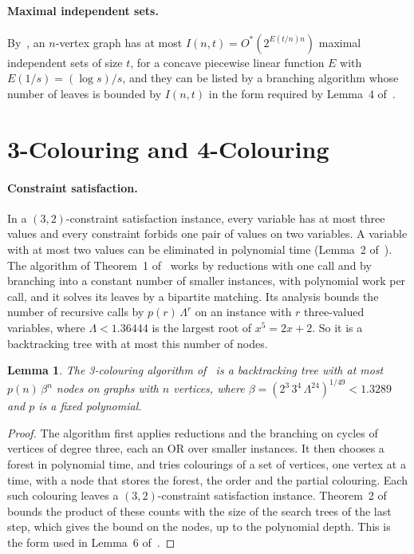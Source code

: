 \documentclass[11pt]{article}
\newtheorem{lemma}[theorem]{Lemma}
\theoremstyle{remark}
\begin{document}
\paragraph{Maximal independent sets.} By~\cite{Bys04}, an $n$-vertex graph has at most $I(n,t) = O^*(2^{E(t/n)n})$ maximal independent sets of size $t$, for a concave piecewise linear function $E$ with $E(1/s) = (\log s)/s$, and they can be listed by a branching algorithm whose number of leaves is bounded by $I(n,t)$ in the form required by Lemma~4 of~\cite{SM22}.

\section{3-Colouring and 4-Colouring}

\paragraph{Constraint satisfaction.} In a $(3,2)$-constraint satisfaction instance, every variable has at most three values and every constraint forbids one pair of values on two variables. A variable with at most two values can be eliminated in polynomial time (Lemma~2 of~\cite{BE05}). The algorithm of Theorem~1 of~\cite{BE05} works by reductions with one call and by branching into a constant number of smaller instances, with polynomial work per call, and it solves its leaves by a bipartite matching. Its analysis bounds the number of recursive calls by $p(r)\,\Lambda^r$ on an instance with $r$ three-valued variables, where $\Lambda < 1.36444$ is the largest root of $x^5 = 2x + 2$. So it is a backtracking tree with at most this number of nodes.

\begin{lemma}\label{lem:three}
The 3-colouring algorithm of~\cite{BE05} is a backtracking tree with at most $p(n)\,\beta^n$ nodes on graphs with $n$ vertices, where $\beta = (2^3\, 3^4\, \Lambda^{24})^{1/49} < 1.3289$ and $p$ is a fixed polynomial.
\end{lemma}

\begin{proof}
The algorithm first applies reductions and the branching on cycles of vertices of degree three, each an OR over smaller instances. It then chooses a forest in polynomial time, and tries colourings of a set of vertices, one vertex at a time, with a node that stores the forest, the order and the partial colouring. Each such colouring leaves a $(3,2)$-constraint satisfaction instance. Theorem~2 of~\cite{BE05} bounds the product of these counts with the size of the search trees of the last step, which gives the bound on the nodes, up to the polynomial depth. This is the form used in Lemma~6 of~\cite{SM22}.
\end{proof}
\end{document}
